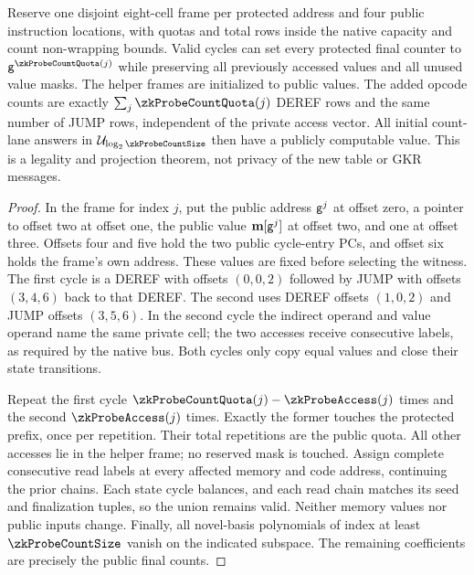 \begin{lemma}\label{lem:zk-probe-count-completion}
Reserve one disjoint eight-cell frame per protected address and four public instruction locations, with quotas and total rows inside the native capacity and count non-wrapping bounds. Valid cycles can set every protected final counter to $\gen^{\zkProbeCountQuota(j)}$ while preserving all previously accessed values and all unused value masks. The helper frames are initialized to public values. The added opcode counts are exactly $\sum_j\zkProbeCountQuota(j)$ DEREF rows and the same number of JUMP rows, independent of the private access vector. All initial count-lane answers in $\subsp_{\log_2\zkProbeCountSize}$ then have a publicly computable value. This is a legality and projection theorem, not privacy of the new table or GKR messages.
\end{lemma}
\begin{proof}
In the frame for index $j$, put the public address $\mathsf{g}^j$ at offset zero, a pointer to offset two at offset one, the public value $\mathbf{m}[\mathsf{g}^j]$ at offset two, and one at offset three. Offsets four and five hold the two public cycle-entry PCs, and offset six holds the frame's own address. These values are fixed before selecting the witness. The first cycle is a DEREF with offsets $(0,0,2)$ followed by JUMP with offsets $(3,4,6)$ back to that DEREF. The second uses DEREF offsets $(1,0,2)$ and JUMP offsets $(3,5,6)$. In the second cycle the indirect operand and value operand name the same private cell; the two accesses receive consecutive labels, as required by the native bus. Both cycles only copy equal values and close their state transitions.

Repeat the first cycle $\zkProbeCountQuota(j)-\zkProbeAccess(j)$ times and the second $\zkProbeAccess(j)$ times. Exactly the former touches the protected prefix, once per repetition. Their total repetitions are the public quota. All other accesses lie in the helper frame; no reserved mask is touched. Assign complete consecutive read labels at every affected memory and code address, continuing the prior chains. Each state cycle balances, and each read chain matches its seed and finalization tuples, so the union remains valid. Neither memory values nor public inputs change. Finally, all novel-basis polynomials of index at least $\zkProbeCountSize$ vanish on the indicated subspace. The remaining coefficients are precisely the public final counts.
\end{proof}

